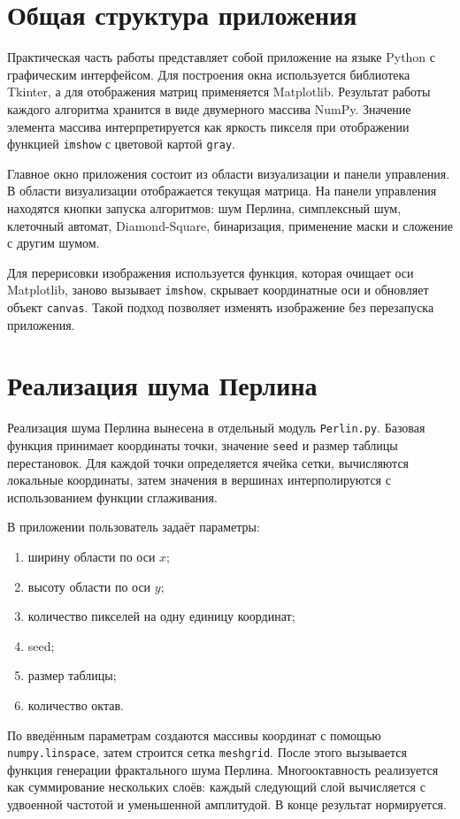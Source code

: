 \section{Общая структура приложения}

Практическая часть работы представляет собой приложение на языке Python с графическим интерфейсом. Для построения окна используется библиотека Tkinter, а для отображения матриц применяется Matplotlib. Результат работы каждого алгоритма хранится в виде двумерного массива NumPy. Значение элемента массива интерпретируется как яркость пикселя при отображении функцией \texttt{imshow} с цветовой картой \texttt{gray}.

Главное окно приложения состоит из области визуализации и панели управления. В области визуализации отображается текущая матрица. На панели управления находятся кнопки запуска алгоритмов: шум Перлина, симплексный шум, клеточный автомат, Diamond-Square, бинаризация, применение маски и сложение с другим шумом.

Для перерисовки изображения используется функция, которая очищает оси Matplotlib, заново вызывает \texttt{imshow}, скрывает координатные оси и обновляет объект \texttt{canvas}. Такой подход позволяет изменять изображение без перезапуска приложения.

\section{Реализация шума Перлина}

Реализация шума Перлина вынесена в отдельный модуль \texttt{Perlin.py}. Базовая функция принимает координаты точки, значение \texttt{seed} и размер таблицы перестановок. Для каждой точки определяется ячейка сетки, вычисляются локальные координаты, затем значения в вершинах интерполируются с использованием функции сглаживания.

В приложении пользователь задаёт параметры:
\begin{enumerate}
    \item ширину области по оси $x$;
    \item высоту области по оси $y$;
    \item количество пикселей на одну единицу координат;
    \item seed;
    \item размер таблицы;
    \item количество октав.
\end{enumerate}

По введённым параметрам создаются массивы координат с помощью \texttt{numpy.linspace}, затем строится сетка \texttt{meshgrid}. После этого вызывается функция генерации фрактального шума Перлина. Многооктавность реализуется как суммирование нескольких слоёв: каждый следующий слой вычисляется с удвоенной частотой и уменьшенной амплитудой. В конце результат нормируется.

